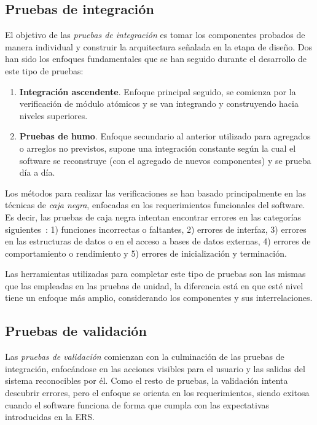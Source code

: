 \subsection{Pruebas de integración}

El objetivo de las \emph{pruebas de integración} es tomar los componentes probados de manera individual y construir la arquitectura señalada en la etapa de diseño. Dos han sido los enfoques fundamentales que se han seguido durante el desarrollo de este tipo de pruebas:

\begin{enumerate}
	\item \textbf{Integración ascendente}. Enfoque principal seguido, se comienza por la verificación de módulo atómicos y se van integrando y construyendo hacia niveles superiores.
	\item \textbf{Pruebas de humo}. Enfoque secundario al anterior utilizado para agregados o arreglos no previstos, supone una integración constante según la cual el software se reconstruye (con el agregado de nuevos componentes) y se prueba día a día.
\end{enumerate}

Los métodos para realizar las verificaciones se han basado principalmente en las técnicas de \emph{caja negra}, enfocadas en los requerimientos funcionales del software. Es decir, las pruebas de caja negra intentan encontrar errores en las categorías siguientes~\cite{Pre10}: 1) funciones incorrectas o faltantes, 2) errores de interfaz, 3) errores en las estructuras de datos o en el acceso a bases de datos externas, 4) errores de comportamiento o rendimiento y 5) errores de inicialización y terminación.

Las herramientas utilizadas para completar este tipo de pruebas son las mismas que las empleadas en las pruebas de unidad, la diferencia está en que esté nivel tiene un enfoque más amplio, considerando los componentes y sus interrelaciones.

\subsection{Pruebas de validación}
\label{subsec:pruebasValidacion}

Las \emph{pruebas de validación} comienzan con la culminación de las pruebas de integración, enfocándose en las acciones visibles para el usuario y las salidas del sistema reconocibles por él. Como el resto de pruebas, la validación intenta descubrir errores, pero el enfoque se orienta en los requerimientos, siendo exitosa cuando el software funciona de forma que cumpla con las expectativas introducidas en la ERS.

